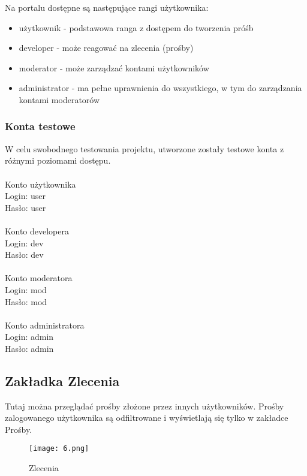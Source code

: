 \documentclass[a4paper,12pt]{article}
\begin{document}
Na portalu dostępne są następujące rangi użytkownika:
\begin{itemize}
    \item użytkownik - podstawowa ranga z dostępem do tworzenia próśb
    \item developer - może reagować na zlecenia (prośby)
    \item moderator - może zarządzać kontami użytkowników
    \item administrator - ma pełne uprawnienia do wszystkiego, w tym do zarządzania kontami moderatorów
\end{itemize}

\subsubsection{Konta testowe}

W celu swobodnego testowania projektu, utworzone zostały testowe konta z różnymi poziomami dostępu.\\\\

Konto użytkownika\\
Login: user\\
Hasło: user\\\\

Konto developera\\
Login: dev\\
Hasło: dev\\\\

Konto moderatora\\
Login: mod\\
Hasło: mod\\\\

Konto administratora\\
Login: admin\\
Hasło: admin\\

\newpage

\subsection{Zakładka Zlecenia}

Tutaj można przeglądać prośby złożone przez innych użytkowników. Prośby zalogowanego użytkownika są odfiltrowane i wyświetlają się tylko w zakładce Prośby.

\begin{figure}[H]
    \centering
    \texttt{[image: 6.png]}
    \caption{Zlecenia}
\end{figure}
\end{document}
